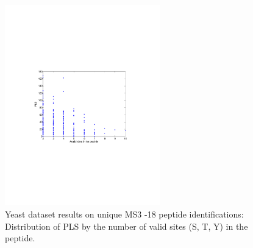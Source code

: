 \begin{figure}[htbp]
\centering %
\includegraphics[trim = 0mm 90mm 20mm 90mm,clip,width=0.6\textwidth]{fig/phospho/uniqueIds/PLS_figs/uniqIds_PLS_by_num_valid_sites.pdf}
\caption{Yeast dataset results on unique MS3 -18 peptide identifications: Distribution of PLS by the number of valid sites (S, T, Y) in the peptide.}
\label{fig:yeast_pls}
\end{figure}

